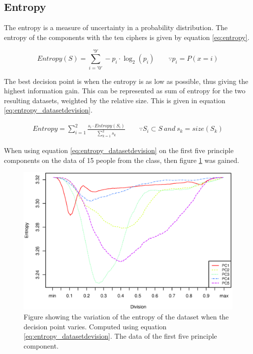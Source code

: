 \subsection{Entropy}

The entropy is a measure of uncertainty in a probability distribution.
The entropy of the components with the ten ciphers is given by equation \ref{eq:entropy}.

\begin{equation}
Entropy(S) = \sum_{i = '0'}^{'9'} -p_i \cdot \log_2(p_i) 
\qquad \because p_i = P(x = i)
\label{eq:entropy}
\end{equation}

The best decision point is when the entropy is as low as possible, thus giving the highest information gain.
This can be represented as sum of entropy for the two resulting datasets, weighted by the relative size.
This is given in equation \ref{eq:entropy_datasetdevision}.

\begin{eqnarray}
Entropy = \sum_{i = 1}^{2} \frac{s_i \cdot Entropy(S_i)}{\sum_{k = 1}^{2} s_k} 
\qquad \because S_i \subset S\ and\ s_k = size(S_k)
\label{eq:entropy_datasetdevision}
\end{eqnarray}

When using equation \ref{eq:entropy_datasetdevision} on the first five principle components on the data of 15 people from the class, then figure \ref{fig:entropy_pc5} was gained.

\begin{figure}[H]
\centering
\includegraphics[width = 0.9 \textwidth]{graphics/entropy_pc}
\caption[Variation of the entropy]{Figure showing the variation of the entropy of the dataset when the decision point varies. Computed using equation \ref{eq:entropy_datasetdevision}. The data of the first five principle component.}
\label{fig:entropy_pc5}
\end{figure}


